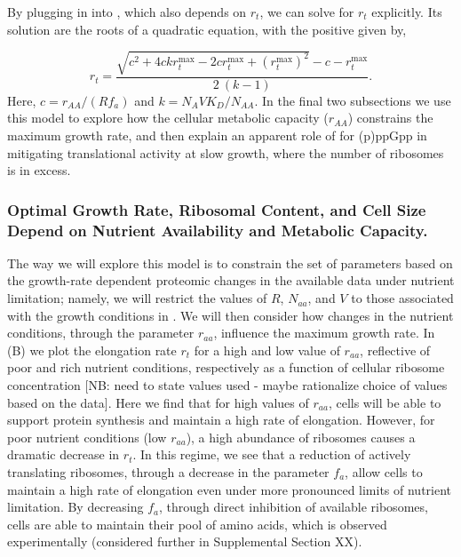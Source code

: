 By plugging in  into , which also depends on $r_t$, we
can solve for $r_t$ explicitly. Its solution are the roots of a quadratic equation,
with the positive given by,

\begin{equation}
r_t = \frac{\sqrt{c^2 + 4 c k r_{t}^{\text{max}} - 2 c r_{t}^{\text{max}} + (r_{t}^{\text{max}})^2} - c - r_{t}^{\text{max}}}{2 \ (k-1)}.
\label{eq:rt_final}
\end{equation}
Here, $c = r_{AA}/(R f_a)$ and $k = N_A V K_D / N_{AA}$. In the final two
subsections we use this model to explore how the cellular metabolic capacity
($r_{AA}$) constrains the maximum growth rate, and then explain an apparent role
of for (p)ppGpp in mitigating translational activity at slow growth, where the
number of ribosomes is in excess.

\subsubsection{Optimal Growth Rate, Ribosomal Content, and Cell Size Depend on Nutrient
Availability and Metabolic Capacity.}

The way we will explore this model is to constrain the set of parameters based
on the growth-rate dependent proteomic changes in the available data under
nutrient limitation;  namely, we will restrict the values of $R$, $N_{aa}$, and
$V$ to those associated with the growth conditions in \cite{schmidt2016}. We
will then consider how changes in the nutrient conditions, through the parameter
$r_{aa}$, influence the maximum growth rate. In (B) we
plot the elongation rate $r_t$ for a high and low value of $r_{aa}$, reflective
of poor and rich nutrient conditions, respectively as a function of cellular
ribosome concentration [NB: need to state values used - maybe rationalize choice
of values based on the data]. Here we find that for high values of $r_{aa}$,
cells will be able to support protein synthesis and maintain a high rate of
elongation. However, for poor nutrient conditions (low $r_{aa}$), a high
abundance of ribosomes causes a dramatic decrease in $r_t$. In this regime, we
see that a reduction of actively translating ribosomes, through a decrease in
the parameter $f_a$, allow cells to maintain a high rate of elongation even
under more pronounced limits of nutrient limitation. By decreasing $f_a$,
through direct inhibition of available ribosomes, cells are able to maintain
their pool of amino acids, which is observed experimentally (considered further in
Supplemental Section XX).

